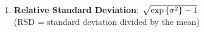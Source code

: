 \begin{enumerate}
    \item \textbf{Relative Standard Deviation}: $\sqrt{\exp\left\{\sigma^2\right\} - 1}$
    \hfill \cite{statistics/book/Statistics-for-Data-Scientists/Maurits-Kaptein}
    \\
    (RSD = standard deviation divided by the mean)
    \hfill \cite{statistics/book/Statistics-for-Data-Scientists/Maurits-Kaptein}
\end{enumerate}






